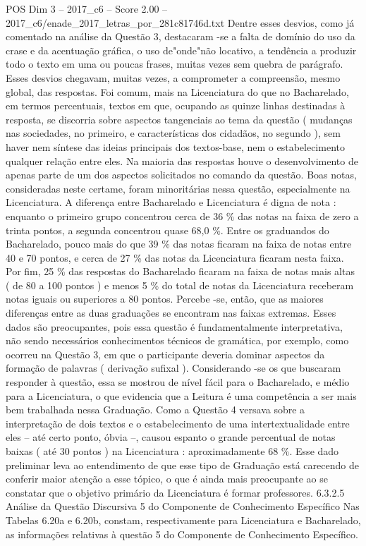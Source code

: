 \begin{textsample}{POS Dim 3 – 2017\_c6 – Score 2.00 – 2017\_c6/enade\_2017\_letras\_por\_281c81746d.txt}
Dentre esses desvios, como já comentado na análise da Questão 3, destacaram -se a falta de domínio do uso da crase e da acentuação gráfica, o uso de"onde"não locativo, a tendência a produzir todo o texto em uma ou poucas frases, muitas vezes sem quebra de parágrafo.
Esses desvios chegavam, muitas vezes, a comprometer a compreensão, mesmo global, das respostas.
Foi comum, mais na Licenciatura do que no Bacharelado, em termos percentuais, textos em que, ocupando as quinze linhas destinadas à resposta, se discorria sobre aspectos tangenciais ao tema da questão ( mudanças nas sociedades, no primeiro, e características dos cidadãos, no segundo ), sem haver nem síntese das ideias principais dos textos-base, nem o estabelecimento qualquer relação entre eles.
Na maioria das respostas houve o desenvolvimento de apenas parte de um dos aspectos solicitados no comando da questão.
Boas notas, consideradas neste certame, foram minoritárias nessa questão, especialmente na Licenciatura.
A diferença entre Bacharelado e Licenciatura é digna de nota : enquanto o primeiro grupo concentrou cerca de 36 \% das notas na faixa de zero a trinta pontos, a segunda concentrou quase 68,0 \%.
Entre os graduandos do Bacharelado, pouco mais do que 39 \% das notas ficaram na faixa de notas entre 40 e 70 pontos, e cerca de 27 \% das notas da Licenciatura ficaram nesta faixa.
Por fim, 25 \% das respostas do Bacharelado ficaram na faixa de notas mais altas ( de 80 a 100 pontos ) e menos 5 \% do total de notas da Licenciatura receberam notas iguais ou superiores a 80 pontos.
Percebe -se, então, que as maiores diferenças entre as duas graduações se encontram nas faixas extremas.
Esses dados são preocupantes, pois essa questão é fundamentalmente interpretativa, não sendo necessários conhecimentos técnicos de gramática, por exemplo, como ocorreu na Questão 3, em que o participante deveria dominar aspectos da formação de palavras ( derivação sufixal ).
Considerando -se os que buscaram responder à questão, essa se mostrou de nível fácil para o Bacharelado, e médio para a Licenciatura, o que evidencia que a Leitura é uma competência a ser mais bem trabalhada nessa Graduação.
Como a Questão 4 versava sobre a interpretação de dois textos e o estabelecimento de uma intertextualidade entre eles – até certo ponto, óbvia –, causou espanto o grande percentual de notas baixas ( até 30 pontos ) na Licenciatura : aproximadamente 68 \%.
Esse dado preliminar leva ao entendimento de que esse tipo de Graduação está carecendo de conferir maior atenção a esse tópico, o que é ainda mais preocupante ao se constatar que o objetivo primário da Licenciatura é formar professores. 6.3.2.5 Análise da Questão Discursiva 5 do Componente de Conhecimento Específico Nas Tabelas 6.20a e 6.20b, constam, respectivamente para Licenciatura e Bacharelado, as informações relativas à questão 5 do Componente de Conhecimento Específico.

\end{textsample}

